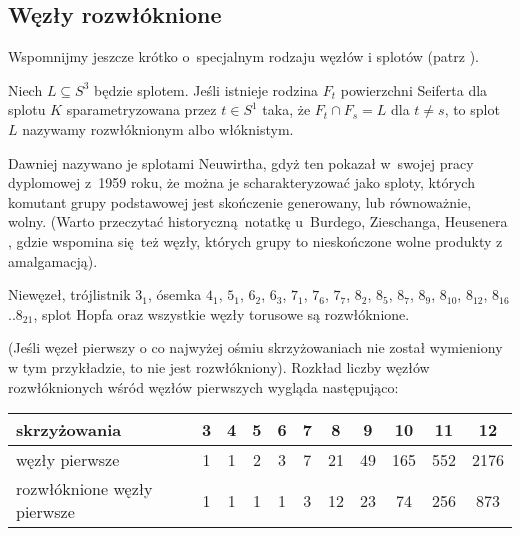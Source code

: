 
\subsection{Węzły rozwłóknione}
%
%
Wspomnijmy jeszcze krótko o~specjalnym rodzaju węzłów i splotów (patrz \cite[s. 49-50]{kawauchi1996}).

\begin{definition}
    Niech $L \subseteq S^3$ będzie splotem.
    Jeśli istnieje rodzina $F_t$ powierzchni Seiferta dla splotu $K$ sparametryzowana przez $t \in S^1$ taka, że $F_t \cap F_s = L$ dla $t \neq s$, to splot $L$ nazywamy rozwłóknionym albo włóknistym.
\end{definition}

%
Dawniej nazywano je splotami Neuwirtha, gdyż ten pokazał w~swojej pracy dyplomowej z~1959 roku, że można je scharakteryzować jako sploty, których komutant grupy podstawowej jest skończenie generowany, lub równoważnie, wolny.
(Warto przeczytać historyczną notatkę u~Burdego, Zieschanga, Heusenera \cite[s. 68]{burde2014}, gdzie wspomina się też węzły, których grupy to nieskończone wolne produkty z amalgamacją).

\begin{example}
    Niewęzeł, trójlistnik $3_1$, ósemka $4_1$, $5_{1}$, $6_{2}$, $6_{3}$, $7_{1}$, $7_{6}$, $7_{7}$, $8_{2}$, $8_{5}$, $8_{7}$, $8_{9}$, $8_{10}$, $8_{12}$, $8_{16}$..$8_{21}$, splot Hopfa oraz wszystkie węzły torusowe są rozwłóknione.
\end{example}

(Jeśli węzeł pierwszy o co najwyżej ośmiu skrzyżowaniach nie został wymieniony w tym przykładzie, to nie jest rozwłókniony).
Rozkład liczby węzłów rozwłóknionych wśród węzłów pierwszych wygląda następująco:

\renewcommand*{\arraystretch}{1.4}
\footnotesize
\begin{longtable}{lcccccccccc}
    \hline
    \textbf{skrzyżowania} & 3 & 4 & 5 & 6 & 7 & 8 & 9 & 10 &  11 &  12 \\ \hline \endhead
    węzły pierwsze & 1 & 1 & 2 & 3 & 7 & 21 & 49 & 165 & 552 & 2176 \\
    rozwłóknione węzły pierwsze & 1 & 1 & 1 & 1 & 3 & 12 & 23 & 74 & 256 & 873 \\
    \hline
\end{longtable}
\normalsize


